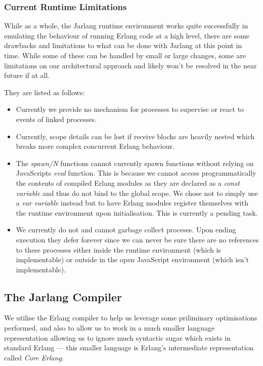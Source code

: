 \documentclass[twoside,12pt,titlepage,a4paper]{article}
\begin{document}
\subsubsection{Current Runtime Limitations}

While as a whole, the Jarlang runtime environment works quite successfully in emulating the behaviour of running Erlang code at a high level, there are some drawbacks and limitations to what can be done with Jarlang at this point in time. While some of these can be handled by small or large changes, some are limitations on our architectural approach and likely won't be resolved in the near future if at all.

They are listed as follows:

\begin{itemize}
	\item Currently we provide no mechanism for processes to supervise or react to events of linked processes.
	\item Currently, scope details can be lost if receive blocks are heavily nested which breaks more complex concurrent Erlang behaviour.
	\item The \textit{spawn/N} functions cannot currently spawn functions without relying on JavaScripts \textit{eval} function. This is because we cannot access programmatically the contents of compiled Erlang modules as they are declared as a \textit{const variable} and thus do not bind to the global scope. We chose not to simply use a \textit{var variable} instead but to have Erlang modules register themselves with the runtime environment upon initialisation. This is currently a pending task.
	\item We currently do not and cannot garbage collect proceses. Upon ending execution they defer forever since we can never be sure there are no references to these processes either inside the runtime environment (which is implementable) or outside in the open JavaScript environment (which isn't implementable).
\end{itemize}

\subsection{The Jarlang Compiler}
We utilise the Erlang compiler to help us leverage some priliminary optimisations performed, and also to allow us to work in a much smaller language representation allowing us to ignore much syntactic sugar which exists in standard Erlang --- this smaller language is Erlang's intermediate representation called \textit{Core Erlang}.
\end{document}
